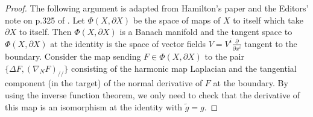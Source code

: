 \begin{proof}
The following argument is adapted from Hamilton's paper
\cite{Ha99} and the Editors' note on p.325 of \cite{CCCY}. Let
$\Phi(X,\partial X)$ be the space of maps of $X$ to itself which
take $\partial X$ to itself. Then $\Phi(X,\partial X)$ is a Banach
manifold and the tangent space to $\Phi(X,\partial X)$ at the
identity is the space of vector fields
$V=V^i\frac{\partial}{\partial x^i}$ tangent to the boundary.
Consider the map sending $F\in \Phi(X,\partial X)$ to the pair
$\{\Delta F,(\nabla_NF)_{//}\}$ consisting of the harmonic map
Laplacian and the tangential component (in the target) of the
normal derivative of $F$ at the boundary. By using the inverse
function theorem, we only need to check that the derivative of
this map is an isomorphism at the identity with $\tilde{g}=g$.


\end{proof}
